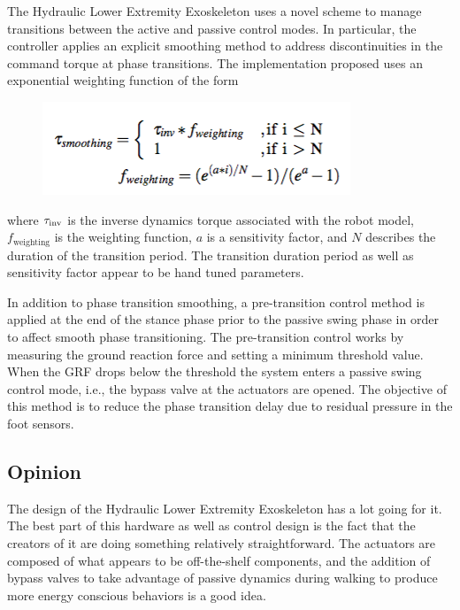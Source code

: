 The Hydraulic Lower Extremity Exoskeleton uses a novel scheme to manage transitions between the active and passive control modes.  In particular, the controller applies an explicit smoothing method to address discontinuities in the command torque at phase transitions.  The implementation proposed uses an exponential weighting function of the form
 \begin{figure}[thpb]
\centering
\includegraphics[width=3.in]{exos/figs/hydLowerExrem/weightingForm}
  \caption{}
 \end{figure}
 
 \noindent
 where ${\bf\tau}_\text{inv}$ is the inverse dynamics torque associated with the robot model, $f_\text{weighting}$ is the weighting function, $a$ is a sensitivity factor, and $N$ describes the duration of the transition period.  The transition duration period as well as sensitivity factor appear to be hand tuned parameters. 

In addition to phase transition smoothing, a pre-transition control method is applied at the end of the stance phase prior to the passive swing phase in order to affect smooth phase transitioning.  The pre-transition control works by measuring the ground reaction force and setting a minimum threshold value.  When the GRF drops below the threshold the system enters a passive swing control mode, i.e., the bypass valve at the actuators are opened.  The objective of this method is to reduce the phase transition delay due to residual pressure in the foot sensors. 


 
 \subsection{Opinion}
 
The design of the Hydraulic Lower Extremity Exoskeleton has a lot going for it.  The best part of this hardware as well as control design is the fact that the creators of it are doing something relatively straightforward.  The actuators are composed of what appears to be off-the-shelf components, and the addition of bypass valves to take advantage of passive dynamics during walking to produce more energy conscious behaviors is a good idea.    

